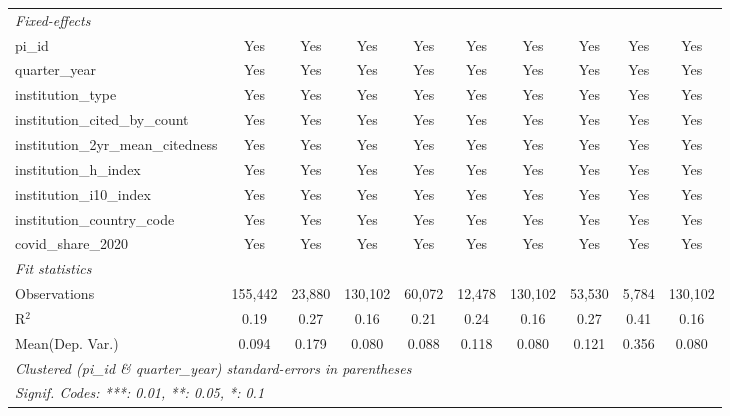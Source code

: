 \begin{tabular}{lccccccccc}
   \midrule
   \emph{Fixed-effects}\\
   pi\_id                                                      & Yes            & Yes            & Yes            & Yes            & Yes           & Yes            & Yes            & Yes            & Yes\\  
   quarter\_year                                               & Yes            & Yes            & Yes            & Yes            & Yes           & Yes            & Yes            & Yes            & Yes\\  
   institution\_type                                           & Yes            & Yes            & Yes            & Yes            & Yes           & Yes            & Yes            & Yes            & Yes\\  
   institution\_cited\_by\_count                               & Yes            & Yes            & Yes            & Yes            & Yes           & Yes            & Yes            & Yes            & Yes\\  
   institution\_2yr\_mean\_citedness                           & Yes            & Yes            & Yes            & Yes            & Yes           & Yes            & Yes            & Yes            & Yes\\  
   institution\_h\_index                                       & Yes            & Yes            & Yes            & Yes            & Yes           & Yes            & Yes            & Yes            & Yes\\  
   institution\_i10\_index                                     & Yes            & Yes            & Yes            & Yes            & Yes           & Yes            & Yes            & Yes            & Yes\\  
   institution\_country\_code                                  & Yes            & Yes            & Yes            & Yes            & Yes           & Yes            & Yes            & Yes            & Yes\\  
   covid\_share\_2020                                          & Yes            & Yes            & Yes            & Yes            & Yes           & Yes            & Yes            & Yes            & Yes\\  
   \midrule
   \emph{Fit statistics}\\
   Observations                                                & 155,442        & 23,880         & 130,102        & 60,072         & 12,478        & 130,102        & 53,530         & 5,784          & 130,102\\  
   R$^2$                                                       & 0.19           & 0.27           & 0.16           & 0.21           & 0.24          & 0.16           & 0.27           & 0.41           & 0.16\\  
Mean(Dep. Var.) & 0.094 & 0.179 & 0.080 & 0.088 & 0.118 & 0.080 & 0.121 & 0.356 & 0.080 \\
   \midrule \midrule
   \multicolumn{10}{l}{\emph{Clustered (pi\_id \& quarter\_year) standard-errors in parentheses}}\\
   \multicolumn{10}{l}{\emph{Signif. Codes: ***: 0.01, **: 0.05, *: 0.1}}\\
\end{tabular}
\par\endgroup
